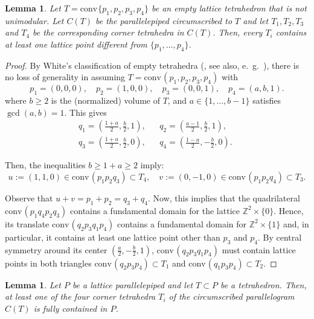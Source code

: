 \documentclass{amsart}
\theoremstyle{plain}
\newtheorem{lemma}[theorem]{Lemma}
\theoremstyle{definition}
\newcommand{\Z}{ \ensuremath{\mathbb{Z}}}
\newcommand{\conv}{\ensuremath{\mathrm{conv}}\hspace{1pt}}
\begin{document}
\begin{lemma}
\label{lemma:corner}
Let $T=\conv\{p_1,p_2,p_3,p_4\}$ be an empty lattice tetrahedron that is not unimodular. Let $C(T)$ be the parallelepiped circumscribed to $T$ and let $T_1, T_2,T_3$ and $T_4$ be the corresponding corner tetrahedra in $C(T)$. Then, every $T_i$ contains at least one lattice point different from $\{p_1,\dots,p_4\}$.
\end{lemma}

\begin{proof}
By White's classification of empty tetrahedra (\cite{White1964}, see also, e.~g.~\cite[Sect.~4.1]{HPPS-survey}), there is no loss of generality in assuming $T=\conv(p_1,p_2,p_3,p_4)$ with
\[
p_1=(0,0,0), \quad
p_2=(1,0,0), \quad
p_3=(0,0,1), \quad
p_4=(a,b,1).
\]
where $b\ge 2$ is the (normalized) volume of $T$, and $a\in \{1,\dots,b-1\}$ satisfies $\gcd(a,b)=1$. This gives 
\begin{align*}
q_1=\left(\frac{1+a}2,\frac{b}2,1\right), &&
q_2=\left(\frac{a-1}2,\frac{b}2,1\right), \quad\\
q_3=\left(\frac{1+a}2,\frac{b}2,0\right), &&
q_4=\left(\frac{1-a}2,-\frac{b}2,0\right).
\end{align*}

Then, the inequalities $b\ge 1+a \ge 2$ imply:
\[
u:=(1,1,0)\in \conv(p_1p_2q_3) \subset T_4, \quad
v:=(0,-1,0)\in \conv(p_1p_2q_4) \subset T_3.
\]

Observe that $u+v=p_1+p_2=q_3+q_4$.
Now, this implies that the quadrilateral $\conv(p_1q_4p_2q_3)$ contains a fundamental domain for the lattice $\Z^2\times\{0\}$. Hence, its translate $\conv(q_2p_3q_1p_4)$ contains a fundamental domain for $\Z^2\times\{1\}$ and, in particular, it contains at least one lattice point other than $p_3$ and $p_4$. By central symmetry around its center $\left(\frac{a}2,-\frac{b}2,1\right)$, $\conv(q_2p_3q_1p_4)$ must contain lattice points in both triangles $\conv(q_2p_3p_4)\subset T_1$ and $\conv(q_1p_3p_4)\subset T_2$.
%


\end{proof}


\begin{lemma}
\label{lemma:3<4}
Let $P$ be a lattice parallelepiped and let $T\subset P$ be a tetrahedron. Then, at least one of the four corner tetrahedra $T_i$ of the circumscribed parallelogram $C(T)$ is fully contained in $P$.
\end{lemma}
\end{document}
